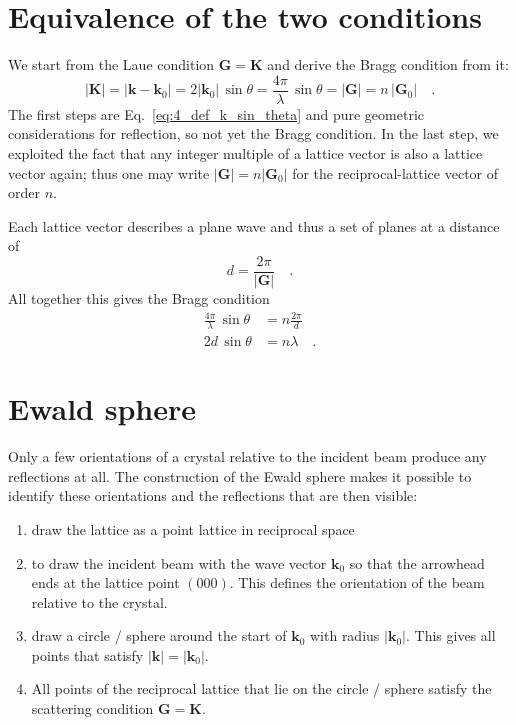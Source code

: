 \section{Equivalence of the two conditions}

We start from the Laue condition $\mathbf{G} = \mathbf{K}$ and derive the Bragg condition from it:
\begin{equation}
 | \mathbf{K} | = |\mathbf{k} - \mathbf{k}_0| = 2 | \mathbf{k}_0| \, \sin \theta = \frac{4 \pi}{ \lambda} \, \sin \theta = | \mathbf{G} | = n \, |\mathbf{G}_0| \quad .
\end{equation}
The first steps are Eq.~\ref{eq:4_def_k_sin_theta} and pure geometric considerations for reflection, so not yet the Bragg condition. In the last step, we exploited the fact that any integer multiple of a lattice vector is also a lattice vector again; thus one may write $|\mathbf{G}| = n |\mathbf{G}_0|$ for the reciprocal-lattice vector of order $n$.

Each lattice vector describes a plane wave and thus a set of planes at a distance of 
\begin{equation}
 d = \frac{2 \pi}{|\mathbf{G} | }  \quad .
\end{equation}
 All together this gives the Bragg condition
 \begin{align}
   \frac{4 \pi}{ \lambda} \, \sin \theta & = n \frac{2 \pi}{d } \\
   2 d \, \sin \theta & = n \lambda \quad .
 \end{align}
 

\section{Ewald sphere} 
Only a few orientations of a crystal relative to the incident beam produce any reflections at all. The construction of the Ewald sphere makes it possible to identify these orientations and the reflections that are then visible:
\begin{enumerate} \setlength{\itemsep}{0pt}
\item draw the lattice as a point lattice in reciprocal space

\item to draw the incident beam with the wave vector $\mathbf{k}_0$ so that the arrowhead ends at the lattice point $(000)$. This defines the orientation of the beam relative to the crystal.

\item draw a circle / sphere around the start of $\mathbf{k}_0$ with radius $|\mathbf{k}_0|$. This gives all points that satisfy $|\mathbf{k}| = |\mathbf{k}_0|$.

\item All points of the reciprocal lattice that lie on the circle / sphere satisfy the scattering condition $\mathbf{G} =\mathbf{K} $.
\end{enumerate}

